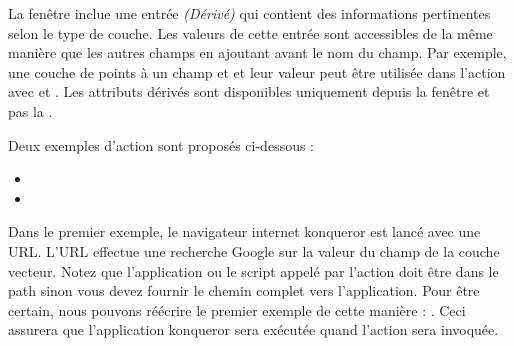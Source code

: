 La fen\^etre  inclue une entr\'ee {\em (D\'eriv\'e)} qui contient des informations pertinentes selon le type de couche. Les valeurs de cette entr\'ee sont accessibles de la m\^eme mani\`ere que les autres champs en ajoutant  avant le nom du champ. Par exemple, une couche de points \`a un champ  et  et leur valeur peut \^etre utilis\'ee dans l'action avec  et . Les attributs d\'eriv\'es sont disponibles uniquement depuis la fen\^etre  et pas la .

Deux exemples d'action sont propos\'es ci-dessous : 

\begin{itemize}
  \item {}
  \item {}
\end{itemize}

Dans le premier exemple, le navigateur internet konqueror est lanc\'e avec une URL. L'URL effectue une recherche Google sur la valeur du champ  de la couche vecteur. Notez que l'application ou le script appel\'e par l'action doit \^etre dans le path sinon vous devez fournir le chemin complet vers l'application. Pour \^etre certain, nous pouvons r\'e\'ecrire le premier exemple de cette mani\`ere : . Ceci assurera que l'application konqueror sera ex\'ecut\'ee quand l'action sera invoqu\'ee.

